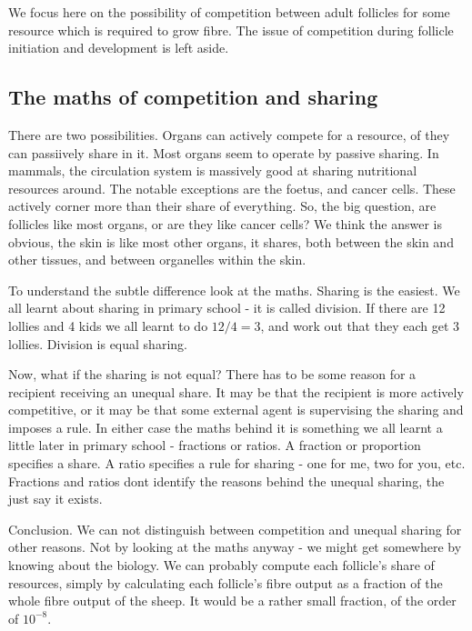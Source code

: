 \documentclass[titlepage]{article}  %
\begin{document}
We focus here on the possibility of competition between adult follicles for some resource which is required to grow fibre.  The issue of competition during follicle initiation and development is left aside.

\subsection{The maths of competition and sharing}
There are two possibilities. Organs can actively compete for a resource, of they can passiively share in it. Most organs seem to operate by passive sharing. In mammals, the circulation system is massively good at sharing nutritional resources around. The notable exceptions are the foetus, and cancer cells. These actively corner more than their share of everything. So, the big question, are follicles like most organs, or are they like cancer cells? We think the answer is obvious, the skin is like most other organs, it shares, both between the skin and other tissues, and between organelles within the skin. 

To understand the subtle difference look at the maths. Sharing is the easiest. We all learnt about sharing in primary school - it is called division.  If there are 12 lollies and 4 kids we all learnt to do $12/4 = 3$, and work out that they each get 3 lollies. Division is equal sharing.

Now, what if the sharing is not equal? There has to be some reason for a recipient receiving an unequal share. It may be that the recipient is more actively competitive, or it may be that some external agent is supervising the sharing and imposes a rule. In either case the maths behind it is something we all learnt a little later in primary school - fractions or ratios.  A fraction or proportion specifies a share. A ratio specifies a rule for sharing - one for me, two for you, etc. Fractions and ratios dont identify the reasons behind the unequal sharing, the just say it exists.

Conclusion. We can not distinguish between competition and unequal sharing for other reasons. Not by looking at the maths anyway - we might get somewhere by knowing about the biology. We can probably compute each follicle's share of resources, simply by calculating each follicle's fibre output as a fraction of the whole fibre output of the sheep. It would be a rather small fraction, of the order of $10^{-8}$.
\end{document}
